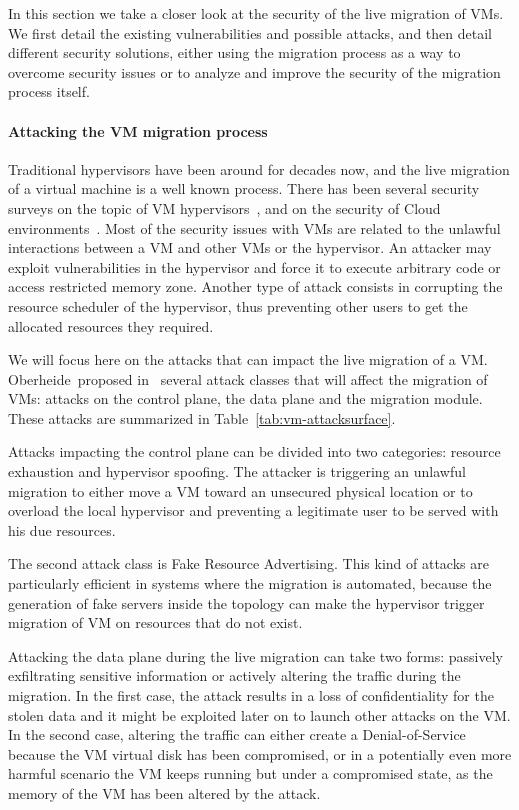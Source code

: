 In this section we take a closer look at the security of the live migration of VMs.
We first detail the existing vulnerabilities and possible attacks, and then detail different security solutions, either using the migration process as a way to overcome security issues or to analyze and improve the security of the migration process itself.

\paragraph{Attacking the VM migration process}
Traditional hypervisors have been around for decades now, and the live migration of a virtual machine is a well known process. There has been several security surveys on the topic of VM hypervisors~\cite{Reuben2007,Rehman2013,Sahoo2010,Perez-Botero2013}, and on the security of Cloud environments~\cite{cloudenvironmentsecuritysurvey-fernandes2014}.
Most of the security issues with VMs are related to the unlawful interactions between a VM and other VMs or the hypervisor.
An attacker may exploit vulnerabilities in the hypervisor and force it to execute arbitrary code or access restricted memory zone.
Another type of attack consists in corrupting the resource scheduler of the hypervisor, thus preventing other users to get the allocated resources they required.

We will focus here on the attacks that can impact the live migration of a VM.
Oberheide~\etal proposed in~\cite{empirical-oberheide2008} several attack classes that will affect the migration of VMs: attacks on the control plane, the data plane and the migration module.
These attacks are summarized in Table~\ref{tab:vm-attacksurface}.

Attacks impacting the control plane can be divided into two categories: resource exhaustion and hypervisor spoofing. The attacker is triggering an unlawful migration to either move a VM toward an unsecured physical location or to overload the local hypervisor and preventing a legitimate user to be served with his due resources.

The second attack class is Fake Resource Advertising. This kind of attacks are particularly efficient in systems where the migration is automated, because the generation of fake servers inside the topology can make the hypervisor trigger migration of VM on resources that do not exist.

Attacking the data plane during the live migration can take two forms: passively exfiltrating sensitive information or actively altering the traffic during the migration.
In the first case, the attack results in a loss of confidentiality for the stolen data and it might be exploited later on to launch other attacks on the VM.
In the second case, altering the traffic can either create a Denial-of-Service because the VM virtual disk has been compromised, or in a potentially even more harmful scenario the VM keeps running but under a compromised state, as the memory of the VM has been altered by the attack.


